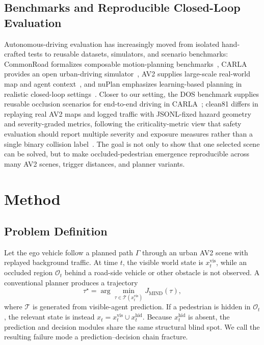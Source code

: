 \documentclass[journal]{IEEEtran}
\begin{document}
\subsection{Benchmarks and Reproducible Closed-Loop Evaluation}

Autonomous-driving evaluation has increasingly moved from isolated hand-crafted tests to reusable datasets, simulators, and scenario benchmarks: CommonRoad formalizes composable motion-planning benchmarks~\cite{althoff2017commonroad}, CARLA provides an open urban-driving simulator~\cite{dosovitskiy2017carla}, AV2 supplies large-scale real-world map and agent context~\cite{argoverse2}, and nuPlan emphasizes learning-based planning in realistic closed-loop settings~\cite{karnchanachari2024nuplan}. Closer to our setting, the DOS benchmark supplies reusable occlusion scenarios for end-to-end driving in CARLA~\cite{shao2023reasonnet}; clean81 differs in replaying real AV2 maps and logged traffic with JSONL-fixed hazard geometry and severity-graded metrics, following the criticality-metric view that safety evaluation should report multiple severity and exposure measures rather than a single binary collision label~\cite{westhofen2023criticality}. The goal is not only to show that one selected scene can be solved, but to make occluded-pedestrian emergence reproducible across many AV2 scenes, trigger distances, and planner variants.

\section{Method}

\subsection{Problem Definition}

Let the ego vehicle follow a planned path $\Gamma$ through an urban AV2 scene with replayed background traffic. At time $t$, the visible world state is $x_t^{\mathrm{vis}}$, while an occluded region $\mathcal{O}_t$ behind a road-side vehicle or other obstacle is not observed. A conventional planner produces a trajectory
\begin{equation}
  \tau^\star = \arg\min_{\tau \in \mathcal{T}(x_t^{\mathrm{vis}})} J_{\mathrm{MIND}}(\tau),
\end{equation}
where $\mathcal{T}$ is generated from visible-agent prediction. If a pedestrian is hidden in $\mathcal{O}_t$, the relevant state is instead $x_t = x_t^{\mathrm{vis}} \cup x_t^{\mathrm{hid}}$. Because $x_t^{\mathrm{hid}}$ is absent, the prediction and decision modules share the same structural blind spot. We call the resulting failure mode a prediction--decision chain fracture.
\end{document}
